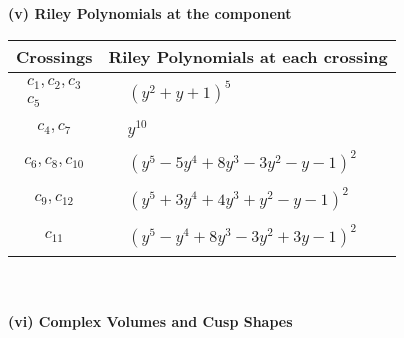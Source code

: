 \documentclass[1p]{elsarticle_modified}
\theoremstyle{definition}
\begin{document}
\newpage\renewcommand{\arraystretch}{1}
\flushleft \textbf{(v) Riley Polynomials at the component}\newline \\
\begin{tabular}{m{50pt}|m{274pt}}
Crossings & \hspace{64pt}Riley Polynomials at each crossing \\
\hline $$\begin{aligned}c_{1},c_{2},c_{3}\\c_{5}\end{aligned}$$&$\begin{aligned}
&(y^2+y+1)^5
\end{aligned}$\\
\hline $$\begin{aligned}c_{4},c_{7}\end{aligned}$$&$\begin{aligned}
&y^{10}
\end{aligned}$\\
\hline $$\begin{aligned}c_{6},c_{8},c_{10}\end{aligned}$$&$\begin{aligned}
&(y^5-5 y^4+8 y^3-3 y^2- y-1)^2
\end{aligned}$\\
\hline $$\begin{aligned}c_{9},c_{12}\end{aligned}$$&$\begin{aligned}
&(y^5+3 y^4+4 y^3+y^2- y-1)^2
\end{aligned}$\\
\hline $$\begin{aligned}c_{11}\end{aligned}$$&$\begin{aligned}
&(y^5- y^4+8 y^3-3 y^2+3 y-1)^2
\end{aligned}$\\
\hline
\end{tabular}\\~\\
\newpage\flushleft \textbf{(vi) Complex Volumes and Cusp Shapes}
\end{document}
